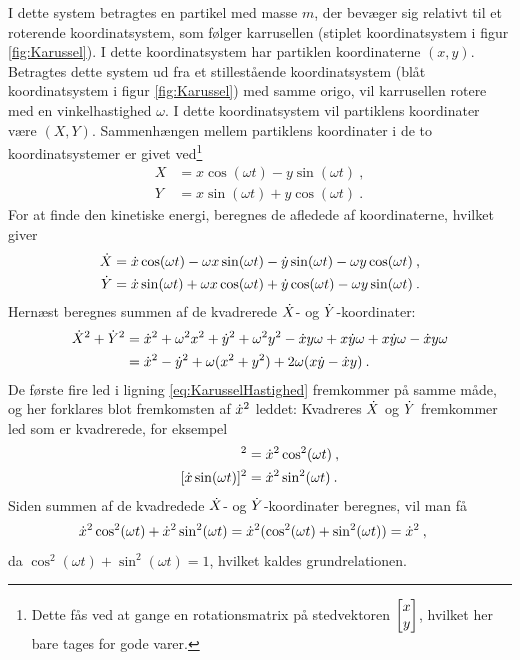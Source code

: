\noindent
I dette system betragtes en partikel med masse $m$, der bevæger sig relativt til et roterende koordinatsystem, som følger karrusellen (stiplet koordinatsystem i figur \ref{fig:Karussel}). I dette koordinatsystem har partiklen koordinaterne $(x,y)$. Betragtes dette system ud fra et stillestående koordinatsystem (blåt koordinatsystem i figur \ref{fig:Karussel}) med samme origo, vil karrusellen rotere med en vinkelhastighed $\omega$. I dette koordinatsystem vil partiklens koordinater være $(X,Y)$. Sammenhængen mellem partiklens koordinater i de to koordinatsystemer er givet ved\footnote{Dette fås ved at gange en rotationsmatrix på stedvektoren $\begin{bmatrix} x \\ y \end{bmatrix}$, hvilket her bare tages for gode varer.}
%
\begin{equation} \label{eq:Karussel_X_Y_koordinater}
	\begin{aligned}
		X &= x \cos(\omega t) - y \sin(\omega t) \: , \\
		Y &= x \sin(\omega t) + y \cos(\omega t) \: .
	\end{aligned}
\end{equation}
%
For at finde den kinetiske energi, beregnes de afledede af koordinaterne, hvilket giver
%
\begin{equation}
	\begin{aligned}
		\dot{X} &= \dot{x} \cos(\omega t) - \omega x \sin(\omega t) - \dot{y} \sin(\omega t) - \omega y \cos(\omega t) \: , \\
		\dot{Y} &= \dot{x} \sin(\omega t) + \omega x \cos(\omega t) + \dot{y} \cos(\omega t) - \omega y \sin(\omega t) \: .
	\end{aligned}
\end{equation}
%
Hernæst beregnes summen af de kvadrerede $\dot{X}$- og $\dot{Y}$-koordinater:
%
\begin{align} \label{eq:KarusselHastighed}
	\dot{X}^2 + \dot{Y}^2 &= \dot{x}^2 + \omega^2 x^2 + \dot{y}^2 + \omega^2 y^2 - \dot{x}y \omega + x \dot{y} \omega + x \dot{y} \omega - \dot{x} y \omega \nonumber \\
	&= \dot{x}^2 - \dot{y}^2 + \omega(x^2 + y^2) + 2 \omega (x \dot{y} - \dot{x} y) \: .
\end{align}
%
De første fire led i ligning \eqref{eq:KarusselHastighed} fremkommer på samme måde, og her forklares blot fremkomsten af $\dot{x}^2$ leddet: Kvadreres $\dot{X}$ og $\dot{Y}$ fremkommer led som er kvadrerede, for eksempel
%
\begin{align*}
	[\dt{x} \cos(\omega t)]^2 &= \dt{x}^2 \cos^2(\omega t) \: , \\
	[\dt{x} \sin(\omega t)]^2 &= \dt{x}^2 \sin^2(\omega t) \: .
\end{align*}
%
Siden summen af de kvadredede $\dot{X}$- og $\dot{Y}$-koordinater beregnes, vil man få
\begin{align*}
	\dot{x}^2 \cos^2(\omega t) + \dot{x}^2 \sin^2(\omega t) &= \dot{x}^2 (\cos^2(\omega t) + \sin^2(\omega t)) = \dot{x}^2 \: ,
\end{align*}
%
da $\cos^2(\omega t) + \sin^2(\omega t) = 1$, hvilket kaldes grundrelationen.

